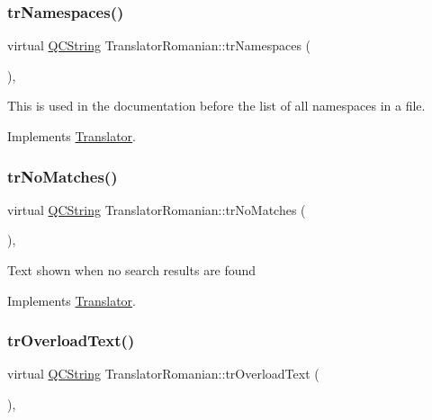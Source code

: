 \subsubsection{\texorpdfstring{trNamespaces()}{trNamespaces()}}
{\footnotesize\ttfamily virtual \mbox{\hyperlink{class_q_c_string}{Q\+C\+String}} Translator\+Romanian\+::tr\+Namespaces (\begin{DoxyParamCaption}{ }\end{DoxyParamCaption})\hspace{0.3cm}{\ttfamily [inline]}, {\ttfamily [virtual]}}

This is used in the documentation before the list of all namespaces in a file. 

Implements \mbox{\hyperlink{class_translator}{Translator}}.

\mbox{\label{class_translator_romanian_ad3cd1a66c2804c22e5726dec1af6264c}} 
\subsubsection{\texorpdfstring{trNoMatches()}{trNoMatches()}}
{\footnotesize\ttfamily virtual \mbox{\hyperlink{class_q_c_string}{Q\+C\+String}} Translator\+Romanian\+::tr\+No\+Matches (\begin{DoxyParamCaption}{ }\end{DoxyParamCaption})\hspace{0.3cm}{\ttfamily [inline]}, {\ttfamily [virtual]}}

Text shown when no search results are found 

Implements \mbox{\hyperlink{class_translator}{Translator}}.

\mbox{\label{class_translator_romanian_a3c3a772aa825dbff387a4dc4c2ea20eb}} 
\subsubsection{\texorpdfstring{trOverloadText()}{trOverloadText()}}
{\footnotesize\ttfamily virtual \mbox{\hyperlink{class_q_c_string}{Q\+C\+String}} Translator\+Romanian\+::tr\+Overload\+Text (\begin{DoxyParamCaption}{ }\end{DoxyParamCaption})\hspace{0.3cm}{\ttfamily [inline]}, {\ttfamily [virtual]}}

